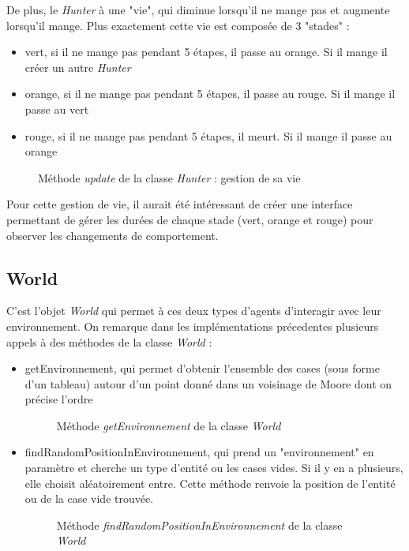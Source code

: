 \documentclass[a4paper, 12pt]{article}
\begin{document}
De plus, le \emph{Hunter} à une "vie", qui diminue lorsqu'il ne mange pas et
augmente lorsqu'il mange. Plus exactement cette vie est composée de 3 "stades" :
\begin{itemize}
  \item vert, si il ne mange pas pendant 5 étapes, il passe au orange. Si il mange il créer un autre \emph{Hunter}
  \item orange, si il ne mange pas pendant 5 étapes, il passe au rouge. Si il mange il passe au vert
  \item rouge, si il ne mange pas pendant 5 étapes, il meurt. Si il mange il passe au orange
\end{itemize}
\begin{figure}[!h]
  \centering
  \caption{Méthode \emph{update}  de la classe \emph{Hunter} : gestion de sa vie}
  
\end{figure}
Pour cette gestion de vie, il aurait été intéressant de créer une interface permettant de gérer les durées de chaque stade (vert, orange
et rouge) pour observer les changements de comportement.


\newpage
\subsection{World}
C'est l'objet \emph{World} qui permet à ces deux types d'agents d'interagir avec leur environnement. On remarque dans les implémentations
précedentes plusieurs appels à des méthodes de la classe \emph{World} :
\begin{itemize}
  \item getEnvironnement, qui permet d'obtenir l'ensemble des cases (sous forme d'un tableau) autour d'un point donné dans un voisinage de Moore dont on précise l'ordre
  \begin{figure}[!h]
    \centering
    \caption{Méthode \emph{getEnvironnement}  de la classe \emph{World}}
    
  \end{figure}

  \item findRandomPositionInEnvironnement, qui prend un "environnement" en paramètre et cherche un type d'entité ou les cases vides. Si il
  y en a plusieurs, elle choisit aléatoirement entre. Cette méthode renvoie la position de l'entité ou de la case vide trouvée.
  \begin{figure}[!h]
    \centering
    \caption{Méthode \emph{findRandomPositionInEnvironnement}  de la classe \emph{World}}
    
  \end{figure}
\end{itemize}
\end{document}
